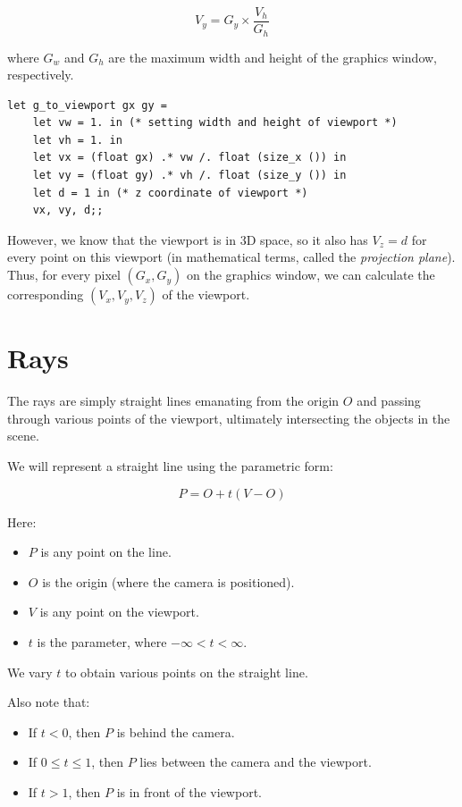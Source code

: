 \documentclass{article}
\begin{document}
$$V_y = G_y \times \frac{V_h}{G_h}$$

where $G_w$ and $G_h$ are the maximum width and height of the graphics window, respectively.

\begin{verbatim}
let g_to_viewport gx gy =
    let vw = 1. in (* setting width and height of viewport *)
    let vh = 1. in
    let vx = (float gx) .* vw /. float (size_x ()) in 
    let vy = (float gy) .* vh /. float (size_y ()) in 
    let d = 1 in (* z coordinate of viewport *)
    vx, vy, d;;
\end{verbatim}

However, we know that the viewport is in 3D space, so it also has $V_z = d$ for every point on this viewport (in mathematical terms, called the \textit{projection plane}). \\
Thus, for every pixel $(G_x, G_y)$ on the graphics window, we can calculate the corresponding $(V_x, V_y, V_z)$ of the viewport.

\section{Rays}

The rays are simply straight lines emanating from the origin $O$ and passing through various points of the viewport, ultimately intersecting the objects in the scene.

We will represent a straight line using the parametric form:

$$P = O + t(V - O)$$

Here:
\begin{itemize}
    \item $P$ is any point on the line.
    \item $O$ is the origin (where the camera is positioned).
    \item $V$ is any point on the viewport.
    \item $t$ is the parameter, where $-\infty < t < \infty$.
\end{itemize}

We vary $t$ to obtain various points on the straight line.

Also note that:
\begin{itemize}
    \item If $t < 0$, then $P$ is behind the camera.
    \item If $0 \leq t \leq 1$, then $P$ lies between the camera and the viewport.
    \item If $t > 1$, then $P$ is in front of the viewport.
\end{itemize}
\end{document}
